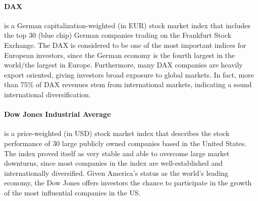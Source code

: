 \documentclass[11pt, parskip=full, DIV=14, headings=small, footsepline, footinclude=false, headsepline]{scrreprt}
\begin{document}
\begin{figure}
  \centering
\end{figure}
%
\paragraph{DAX} is a German capitalization-weighted (in EUR) stock market index that includes the top 30 (blue chip) German companies trading on the Frankfurt Stock Exchange.
The DAX is considered to be one of the most important indices for European investors, since the German economy is the fourth largest in the world/the largest in Europe.
Furthermore, many DAX companies are heavily export oriented, giving investors broad exposure to global markets. In fact, more than 75\% of DAX revenues stem from international markets, indicating a sound international diversification.

\begin{figure}
  \centering
\end{figure}
%
\paragraph{Dow Jones Industrial Average} is a price-weighted (in USD) stock market index that describes the stock performance of 30 large publicly owned companies based in the United States.
The index proved itself as very stable and able to overcome large market downturns, since most companies in the index are well-established and internationally diversified.
Given America's status as the world's leading economy, the Dow Jones offers investors the chance to participate in the growth of the most influential companies in the US.

\begin{figure}
  \centering
\end{figure}
%
\end{document}
